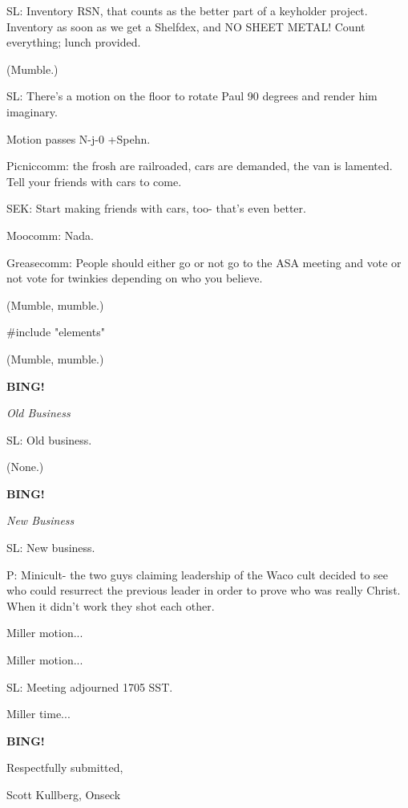 \documentclass[12pt]{article}
\newcommand{\bing}{{\bf BING!} }
\newcommand{\goto}[1]{\bing \vskip 12pt \centerline{{\em{#1}}}}
\begin{document}
SL: Inventory RSN, that counts as the better part of a keyholder project. Inventory as soon as we get a Shelfdex, and NO SHEET METAL! Count everything; lunch provided.

(Mumble.)

SL: There's a motion on the floor to rotate Paul 90 degrees and render him imaginary.

Motion passes N-j-0 +Spehn.

Picniccomm: the frosh are railroaded, cars are demanded, the van is lamented. Tell your friends with cars to come.

SEK: Start making friends with cars, too- that's even better.

Moocomm: Nada.

Greasecomm: People should either go or not go to the ASA meeting and vote or not vote for twinkies depending on who you believe.

(Mumble, mumble.)

#include "elements"

(Mumble, mumble.)

\goto{Old Business}

SL: Old business.

(None.)

\goto{New Business}

SL: New business.

P: Minicult- the two guys claiming leadership of the Waco cult decided to see who could resurrect the previous leader in order to prove who was really Christ. When it didn't work they shot each other.

Miller motion...

Miller motion...

SL: Meeting adjourned 1705 SST.

Miller time...

\bing

\vspace{12pt}

\vspace{18pt}

\centerline{Respectfully submitted,}
\centerline{Scott Kullberg, Onseck}
\end{document}
